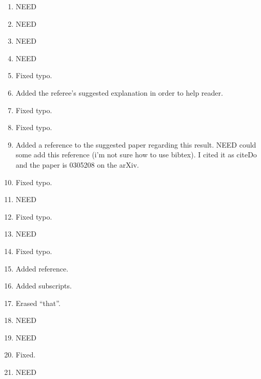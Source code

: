 \documentclass{amsart}
\begin{document}
\begin{enumerate}
\item NEED

\item NEED

\item NEED

\item NEED

\item Fixed typo.

\item Added the referee's suggested explanation in order to help reader. 

\item Fixed typo.

\item Fixed typo.

\item Added a reference to the suggested paper regarding this result. NEED could some add this reference (i'm not sure how to use bibtex). I cited it as cite{Do} and the paper is 0305208 on the arXiv. 

\item Fixed typo.

\item NEED

\item Fixed typo.

\item NEED

\item Fixed typo.

\item Added reference. 

\item Added subscripts.

\item Erased ``that''. 

\item NEED

\item NEED

\item Fixed.

\item NEED

\end{enumerate}
\end{document}

